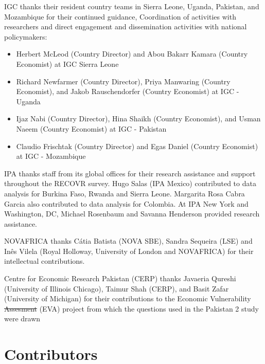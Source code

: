 \documentclass[
  12pt,
]{article}
\providecommand{\tightlist}{%
  \setlength{\itemsep}{0pt}\setlength{\parskip}{0pt}}
\providecommand{\DIFaddtex}[1]{{\protect\color{blue}\uwave{#1}}} %
\providecommand{\DIFdeltex}[1]{{\protect\color{red}\sout{#1}}}                      %
\providecommand{\DIFaddbegin}{} %
\providecommand{\DIFaddend}{} %
\providecommand{\DIFdelbegin}{} %
\providecommand{\DIFdelend}{} %
\providecommand{\DIFadd}[1]{\texorpdfstring{\DIFaddtex{#1}}{#1}} %
\providecommand{\DIFdel}[1]{\texorpdfstring{\DIFdeltex{#1}}{}} %
\newcommand{\DIFscaledelfig}{0.5}
\newlength{\DIFdelgraphicswidth} %
\newlength{\DIFdelgraphicsheight} %
\newcommand{\DIFaddincludegraphics}[2][]{{\color{blue}\fbox{\DIFOincludegraphics[#1]{#2}}}} %
\newcommand{\DIFdelincludegraphics}[2][]{%
\sbox{\DIFdelgraphicsbox}{\DIFOincludegraphics[#1]{#2}}%
\settoboxwidth{\DIFdelgraphicswidth}{\DIFdelgraphicsbox} %
\settoboxtotalheight{\DIFdelgraphicsheight}{\DIFdelgraphicsbox} %
\scalebox{\DIFscaledelfig}{%
\parbox[b]{\DIFdelgraphicswidth}{\usebox{\DIFdelgraphicsbox}\\[-\baselineskip] \rule{\DIFdelgraphicswidth}{0em}}\llap{\resizebox{\DIFdelgraphicswidth}{\DIFdelgraphicsheight}{%
\setlength{\unitlength}{\DIFdelgraphicswidth}%
\begin{picture}(1,1)%
\thicklines\linethickness{2pt} %
{\color[rgb]{1,0,0}\put(0,0){\framebox(1,1){}}}%
{\color[rgb]{1,0,0}\put(0,0){\line( 1,1){1}}}%
{\color[rgb]{1,0,0}\put(0,1){\line(1,-1){1}}}%
\end{picture}%
}\hspace*{3pt}}} %
} %
\DeclareRobustCommand{\DIFaddbegin}{\DIFOaddbegin \let\includegraphics\DIFaddincludegraphics} %
\DeclareRobustCommand{\DIFaddend}{\DIFOaddend \let\includegraphics\DIFOincludegraphics} %
\DeclareRobustCommand{\DIFdelbegin}{\DIFOdelbegin \let\includegraphics\DIFdelincludegraphics} %
\DeclareRobustCommand{\DIFdelend}{\DIFOaddend \let\includegraphics\DIFOincludegraphics} %
\begin{document}
IGC thanks their resident country teams in Sierra Leone, Uganda, Pakistan, and Mozambique for their continued guidance, Coordination of activities with researchers and direct engagement and dissemination activities with national policymakers:

\begin{itemize}
\tightlist
\item
  Herbert McLeod (Country Director) and Abou Bakarr Kamara (Country Economist) at IGC Sierra Leone
\item
  Richard Newfarmer (Country Director), Priya Manwaring (Country Economist), and Jakob Rauschendorfer (Country Economist) at IGC - Uganda
\item
  Ijaz Nabi (Country Director), Hina Shaikh (Country Economist), and Usman Naeem (Country Economist) at IGC - Pakistan
\item
  Claudio Frischtak (Country Director) and Egas Daniel (Country Economist) at IGC - Mozambique
\end{itemize}

IPA thanks staff from its global offices for their research assistance and support throughout the RECOVR survey. Hugo Salas (IPA Mexico) contributed to data analysis for Burkina Faso, Rwanda and Sierra Leone. Margarita Rosa Cabra Garcia also contributed to data analysis for Colombia. At IPA New York and Washington, DC, Michael Rosenbaum and Savanna Henderson provided research assistance.

NOVAFRICA thanks Cátia Batista (NOVA SBE), Sandra Sequeira (LSE) and Inês Vilela (Royal Holloway, University of London and NOVAFRICA) for their intellectual contributions.

Centre for Economic Research Pakistan (CERP) thanks Javaeria Qureshi (University of Illinois Chicago), Taimur Shah (CERP), and Basit Zafar (University of Michigan) for their contributions to the Economic Vulnerability \DIFdelbegin \DIFdel{Assesment }\DIFdelend \DIFaddbegin \DIFadd{Assessment }\DIFaddend (EVA) project from which the questions used in the Pakistan 2 study were drawn

\hypertarget{contributors}{%
\section*{Contributors}\label{contributors}}
\end{document}

